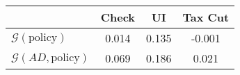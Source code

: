 \begin{tabular}{@{}lccc@{}} 
\toprule 
                          & Check      & UI    & Tax Cut    \\  \midrule 
$\mathcal{G}(\text{policy})$ & 0.014  & 0.135  & -0.001     \\ 
$\mathcal{G}(AD,\text{policy})$ & 0.069  & 0.186  & 0.021     \\ 
\end{tabular}  
